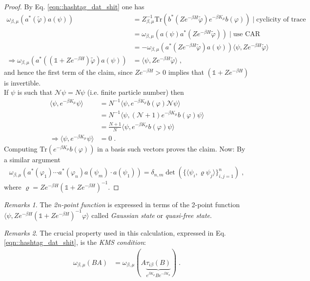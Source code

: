 \documentclass[
a4paper, %
11pt, %
onecolumn, %
openany, %
]{memoir}
\theoremstyle{definition}
\theoremstyle{remark}
\newtheorem{remarks}{Remarks}[chapter]
\theoremstyle{plain}
\begin{document}
\begin{proof}
	By Eq. \eqref{eqn::hashtag_dat_shit} one has \begin{align}
	\omega_{\beta,\mu}(a^{*}(\tilde{\varphi})a(\psi))&=Z^{-1}_{\beta,\mu}\mathrm{Tr}(b^*(Ze^{-\beta H}\tilde{\varphi})e^{-\beta K_{\mu}}b(\varphi)) \mid \text{cyclicity of trace}\\
	&=\omega_{\beta,\mu}(a(\psi)a^*(Ze^{-\beta H}\tilde{\varphi})) \mid \text{use CAR}\\
	&=-\omega_{\beta,\mu}(a^*(Ze^{-\beta H}\tilde{\varphi})a(\psi))\langle \psi, Ze^{-\beta H}\tilde{\varphi}\rangle\\
	\Rightarrow \omega_{\beta,\mu}(a^*((\mathds{1}+Ze^{-\beta H})\tilde{\varphi})a(\psi))&=\langle \psi, Ze^{-\beta H} \tilde{\varphi}\rangle\; ,
	\end{align}
	and hence the first term of the claim, since $Ze^{-\beta H}>0$ implies that $(\mathds{1}+Ze^{-\beta H})$ is invertible.\\
	If $\psi$ is such that $\mathcal{N}\psi= N\psi$ (i.e. finite particle number) then \begin{align}
	\langle \psi,e^{-\beta K_{\mu}}\psi\rangle &={N}^{-1}\langle \psi , e^{-\beta K_{\mu}}b(\varphi)\mathcal{N}\psi\rangle\\
	&= N^{-1}\langle \psi, (\mathcal{N}+1)e^{-\beta K_{\mu}}b(\varphi)\psi\rangle\\
	&=\frac{N+1}{N}\langle \psi, e^{-\beta K_{\mu}}b(\varphi)\psi\rangle\\
	\Rightarrow \langle \psi,e^{-\beta K_{\mu}}\psi\rangle&=0\; .
	\end{align}
	Computing $\mathrm{Tr}(e^{-\beta K_{\mu}}b(\varphi))$ in a basis such vectors proves the claim. Now: By a similar argument \begin{align}
	\omega_{\beta,\mu}(a^*(\varphi_1)\cdots a^{*}(\varphi_n)a(\psi_m)\cdot a(\psi_1))=\delta_{n,m}\det\left(\{\langle\psi_i,\varrho\psi_j\rangle\}_{i,j=1}^{n}\right)\; ,	\end{align}$\text{where }\varrho = Ze^{-\beta H}(\mathds{1}+Ze^{-\beta H})^{-1}$.
\end{proof}
\begin{remarks}
	The \textit{2n-point function} is expressed in terms of the 2-point function $\langle \psi, Ze^{-\beta H}(\mathds{1}+Ze^{-\beta H})^{-1}\varphi\rangle$ called \textit{Gaussian state} or \textit{quasi-free state}.
\end{remarks}
\begin{remarks}
	The crucial property used in this calculation, expressed in Eq. \eqref{eqn::hashtag_dat_shit}, is the \textit{KMS condition}: \begin{align}
	\omega_{\beta,\mu}(BA)&=\omega_{\beta,\mu}(A\underbrace{\tau_{i\beta}(B)}_{e^{\beta K_{\mu}}Be^{-\beta K_{\mu}}})\; .
	\end{align}
\end{remarks}
\end{document}

